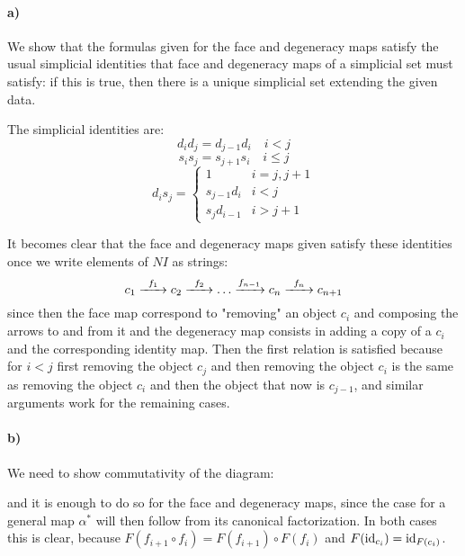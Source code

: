 \documentclass[a4paper,11pt,english]{article}
\begin{document}
\begin{exercise}[3]

\paragraph{a)} We show that the formulas given for the face and degeneracy maps satisfy the usual simplicial identities that face and degeneracy maps of a simplicial set must satisfy: if this is true, then there is a unique simplicial set extending the given data.

The simplicial identities are:
\[d_id_j=d_{j-1}d_i\quad i<j\]
\[s_is_j=s_{j+1}s_i\quad i\leq j\] 
\[d_is_j=\begin{cases}
1 & i=j,j+1 \\
s_{j-1}d_i & i<j \\
s_jd_{i-1} & i>j+1
\end{cases}\]

It becomes clear that the face and degeneracy maps given satisfy these identities once we write elements of $NI$ as strings:
\[c_1\xto{\,\ f_1\ }c_2\xto{\,\ f_2\ }\dots\xto{f_{n-1}}c_{n}\xto{\,\ f_{n}\ }c_{n+1}\]
since then the face map correspond to "removing" an object $c_i$ and composing the arrows to and from it and the degeneracy map consists in adding a copy of a $c_i$ and the corresponding identity map. Then the first relation is satisfied because for $i<j$ first removing the object $c_j$ and then removing the object $c_i$ is the same as removing the object $c_i$ and then the object that now is $c_{j-1}$, and similar arguments work for the remaining cases.

\paragraph{b)} We need to show commutativity of the diagram:
\begin{center}
\end{center}
and it is enough to do so for the face and degeneracy maps, since the case for a general map $\alpha^*$ will then follow from its canonical factorization. In both cases this is clear, because $F(f_{i+1}\circ f_i)=F(f_{i+1})\circ F(f_i)$ and $F(\operatorname{id}_{c_i})=\operatorname{id}_{F(c_i)}$.


\end{exercise}
\end{document}
